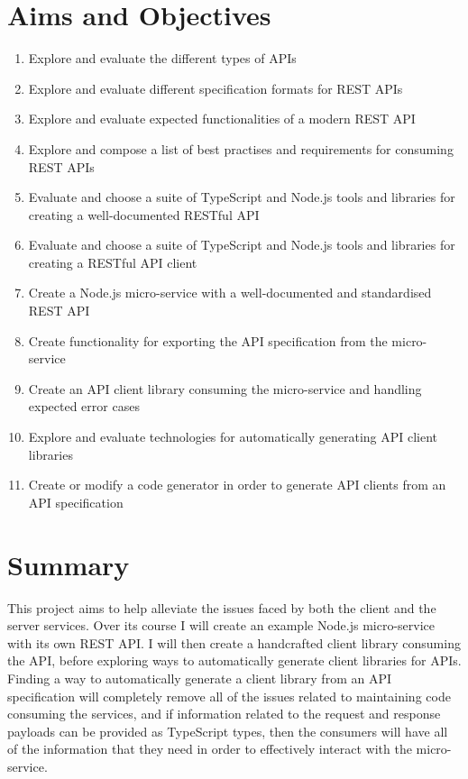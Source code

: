 \section{Aims and Objectives}
 \begin{enumerate}
   \item Explore and evaluate the different types of APIs
   \item Explore and evaluate different specification formats for REST APIs
   \item Explore and evaluate expected functionalities of a modern REST API
   \item Explore and compose a list of best practises and requirements for consuming REST APIs
   \item Evaluate and choose a suite of TypeScript and Node.js tools and libraries for creating a well-documented RESTful API
   \item Evaluate and choose a suite of TypeScript and Node.js tools and libraries for creating a RESTful API client
   \item Create a Node.js micro-service with a well-documented and standardised REST API
   \item Create functionality for exporting the API specification from the micro-service
   \item Create an API client library consuming the micro-service and handling expected error cases
   \item Explore and evaluate technologies for automatically generating API client libraries
   \item Create or modify a code generator in order to generate API clients from an API specification
 \end{enumerate} 
 \section{Summary}
 
 This project aims to help alleviate the issues faced by both the client and the server services. Over its course I will create an example Node.js micro-service with its own REST API. I will then create a handcrafted client library consuming the API, before exploring ways to automatically generate client libraries for APIs. Finding a way to automatically generate a client library from an API specification will completely remove all of the issues related to maintaining code consuming the services, and if information related to the request and response payloads can be provided as TypeScript types, then the consumers will have all of the information that they need in order to effectively interact with the micro-service.